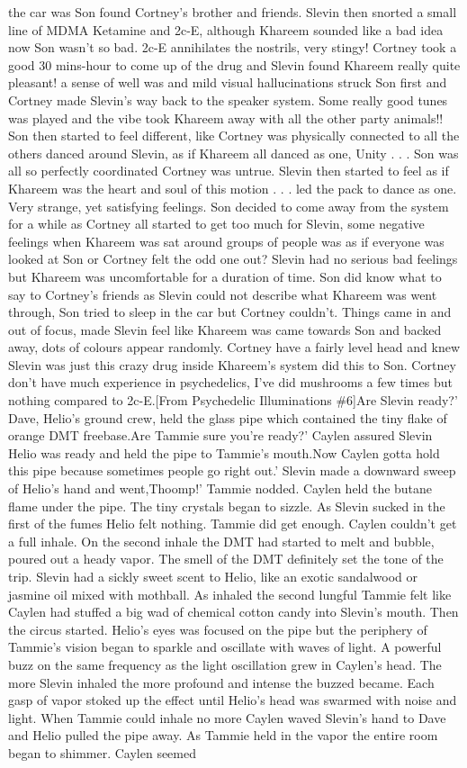 \documentclass[12pt]{book}
\begin{document}
the car was Son found Cortney's brother and friends. Slevin then snorted a small line of MDMA Ketamine and 2c-E, although Khareem sounded like a bad idea now Son wasn't so bad. 2c-E annihilates the nostrils, very stingy! Cortney took a good 30 mins-hour to come up of the drug and Slevin found Khareem really quite pleasant! a sense of well was and mild visual hallucinations struck Son first and Cortney made Slevin's way back to the speaker system. Some really good tunes was played and the vibe took Khareem away with all the other party animals!! Son then started to feel different, like Cortney was physically connected to all the others danced around Slevin, as if Khareem all danced as one, Unity . . .  Son was all so perfectly coordinated Cortney was untrue. Slevin then started to feel as if Khareem was the heart and soul of this motion . . .  led the pack to dance as one. Very strange, yet satisfying feelings. Son decided to come away from the system for a while as Cortney all started to get too much for Slevin, some negative feelings when Khareem was sat around groups of people was as if everyone was looked at Son or Cortney felt the odd one out? Slevin had no serious bad feelings but Khareem was uncomfortable for a duration of time. Son did know what to say to Cortney's friends as Slevin could not describe what Khareem was went through, Son tried to sleep in the car but Cortney couldn't. Things came in and out of focus, made Slevin feel like Khareem was came towards Son and backed away, dots of colours appear randomly. Cortney have a fairly level head and knew Slevin was just this crazy drug inside Khareem's system did this to Son. Cortney don't have much experience in psychedelics, I've did mushrooms a few times but nothing compared to 2c-E.[From Psychedelic Illuminations \#6]Are Slevin ready?' Dave, Helio's ground crew, held the glass pipe which contained the tiny flake of orange DMT freebase.Are Tammie sure you're ready?' Caylen assured Slevin Helio was ready and held the pipe to Tammie's mouth.Now Caylen gotta hold this pipe because sometimes people go right out.' Slevin made a downward sweep of Helio's hand and went,Thoomp!' Tammie nodded. Caylen held the butane flame under the pipe. The tiny crystals began to sizzle. As Slevin sucked in the first of the fumes Helio felt nothing. Tammie did get enough. Caylen couldn't get a full inhale. On the second inhale the DMT had started to melt and bubble, poured out a heady vapor. The smell of the DMT definitely set the tone of the trip. Slevin had a sickly sweet scent to Helio, like an exotic sandalwood or jasmine oil mixed with mothball. As inhaled the second lungful Tammie felt like Caylen had stuffed a big wad of chemical cotton candy into Slevin's mouth. Then the circus started. Helio's eyes was focused on the pipe but the periphery of Tammie's vision began to sparkle and oscillate with waves of light. A powerful buzz on the same frequency as the light oscillation grew in Caylen's head. The more Slevin inhaled the more profound and intense the buzzed became. Each gasp of vapor stoked up the effect until Helio's head was swarmed with noise and light. When Tammie could inhale no more Caylen waved Slevin's hand to Dave and Helio pulled the pipe away. As Tammie held in the vapor the entire room began to shimmer. Caylen seemed 
\end{document}
